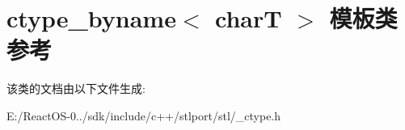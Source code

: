 \hypertarget{classctype__byname}{}\section{ctype\+\_\+byname$<$ charT $>$ 模板类 参考}
\label{classctype__byname}


该类的文档由以下文件生成\+:\begin{DoxyCompactItemize}
\item 
E\+:/\+React\+O\+S-\/0../sdk/include/c++/stlport/stl/\+\_\+ctype.\+h\end{DoxyCompactItemize}
